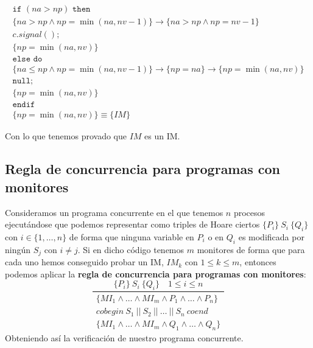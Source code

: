 \begin{ejercicio*}
\begin{enumerate}
\begin{gather*}
                \texttt{if\ } (na > np) \texttt{\ then\ } \\
                \{na > np \land np = \min(na,nv-1)\} \rightarrow \{na > np \land np = nv-1\}\\
                c.signal(); \\
                \{np = \min(na,nv)\} \\
                \texttt{else do} \\
                \{na \leq np \land np = \min(na,nv-1)\}\rightarrow\{np = na\} \rightarrow \{np = \min(na,nv)\} \\
                \texttt{null;} \\
                \{np = \min(na,nv)\} \\
                \texttt{endif} \\
                \{np = \min(na,nv)\} \equiv \{IM\}
            \end{gather*}
    \end{enumerate}
    Con lo que tenemos provado que $IM$ es un IM\@.
\end{ejercicio*}

\subsection{Regla de concurrencia para programas con monitores}
Consideramos un programa concurrente en el que tenemos $n$ procesos ejecutándose que podemos representar como triples de Hoare ciertos $\{P_i\}\ S_i\ \{Q_i\}$ con \newline $i \in \{1, \ldots, n\}$ de forma que ninguna variable en $P_i$ o en $Q_i$ es modificada por ningún $S_j$ con $i\neq j$. Si en dicho código tenemos $m$ monitores de forma que para cada uno hemos conseguido probar un IM, $IM_k$ con $1 \leq k \leq m$, entonces podemos aplicar la \textbf{regla de concurrencia para programas con monitores}:
\begin{equation*}
    \dfrac{\{P_i\}\ S_i\ \{Q_i\} \quad 1 \leq i \leq n}{\begin{array}{c}
            \{MI_1 \land \ldots \land MI_m \land P_1 \land \ldots\land P_n\} \\
            cobegin\ S_1\ ||\ S_2\ ||\ \ldots\ ||\ S_n\ coend \\
            \{MI_1 \land \ldots \land MI_m \land Q_1 \land  \ldots\land Q_n\} 
        \end{array}}
\end{equation*}
Obteniendo así la verificación de nuestro programa concurrente.

